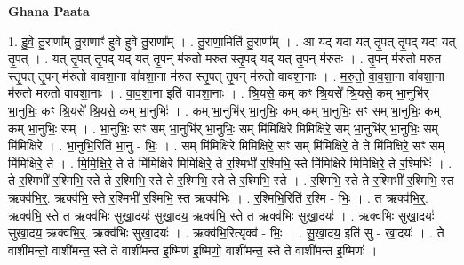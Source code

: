 \documentclass[17pt]{extarticle}
\begin{document}
\textbf{Ghana Paata } \newline

1. हु॒वे॒ तु॒राणा᳚म् तु॒राणाꣳ॑ हुवे हुवे तु॒राणा᳚म् । . तु॒राणा॒मिति॑ तु॒राणा᳚म् । . आ यद् यदा यत् तृ॒पत् तृ॒पद् यदा यत् तृ॒पत् । . यत् तृ॒पत् तृ॒पद् यद् यत् तृ॒पन् म॑रुतो मरुत स्तृ॒पद् यद् यत् तृ॒पन् म॑रुतः । . तृ॒पन् म॑रुतो मरुत स्तृ॒पत् तृ॒पन् म॑रुतो वावशा॒ना वा॑वशा॒ना म॑रुत स्तृ॒पत् तृ॒पन् म॑रुतो वावशा॒नाः । . म॒रु॒तो॒ वा॒व॒शा॒ना वा॑वशा॒ना म॑रुतो मरुतो वावशा॒नाः । . वा॒व॒शा॒ना इति॑ वावशा॒नाः । . श्रि॒यसे॒ कम् कꣳ श्रि॒यसे᳚ श्रि॒यसे॒ कम् भा॒नुभि॑र् भा॒नुभिः॒ कꣳ श्रि॒यसे᳚ श्रि॒यसे॒ कम् भा॒नुभिः॑ । . कम् भा॒नुभि॑र् भा॒नुभिः॒ कम् कम् भा॒नुभिः॒ सꣳ सम् भा॒नुभिः॒ कम् कम् भा॒नुभिः॒ सम् । . भा॒नुभिः॒ सꣳ सम् भा॒नुभि॑र् भा॒नुभिः॒ सम् मि॑मिक्षिरे मिमिक्षिरे॒ सम् भा॒नुभि॑र् भा॒नुभिः॒ सम् मि॑मिक्षिरे । . भा॒नुभि॒रिति॑ भा॒नु - भिः॒ । . सम् मि॑मिक्षिरे मिमिक्षिरे॒ सꣳ सम् मि॑मिक्षिरे॒ ते ते मि॑मिक्षिरे॒ सꣳ सम् मि॑मिक्षिरे॒ ते । . मि॒मि॒क्षि॒रे॒ ते ते मि॑मिक्षिरे मिमिक्षिरे॒ ते र॒श्मिभी॑ र॒श्मिभि॒ स्ते मि॑मिक्षिरे मिमिक्षिरे॒ ते र॒श्मिभिः॑ । . ते र॒श्मिभी॑ र॒श्मिभि॒ स्ते ते र॒श्मिभि॒ स्ते ते र॒श्मिभि॒ स्ते ते र॒श्मिभि॒ स्ते । . र॒श्मिभि॒ स्ते ते र॒श्मिभी॑ र॒श्मिभि॒ स्त ऋक्व॑भि॒र्॒. ऋक्व॑भि॒ स्ते र॒श्मिभी॑ र॒श्मिभि॒ स्त ऋक्व॑भिः । . र॒श्मिभि॒रिति॑ र॒श्मि - भिः॒ । . त ऋक्व॑भि॒र्॒. ऋक्व॑भि॒ स्ते त ऋक्व॑भिः सुखा॒दयः॑ सुखा॒दय॒ ऋक्व॑भि॒ स्ते त ऋक्व॑भिः सुखा॒दयः॑ । . ऋक्व॑भिः सुखा॒दयः॑ सुखा॒दय॒ ऋक्व॑भि॒र्॒. ऋक्व॑भिः सुखा॒दयः॑ । . ऋक्व॑भि॒रित्यृक्व॑ - भिः॒ । . सु॒खा॒दय॒ इति॑ सु - खा॒दयः॑ । . ते वाशी॑मन्तो॒ वाशी॑मन्त॒ स्ते ते वाशी॑मन्त इ॒ष्मिण॑ इ॒ष्मिणो॒ वाशी॑मन्त॒ स्ते ते वाशी॑मन्त इ॒ष्मिणः॑ । \newline
\end{document}
